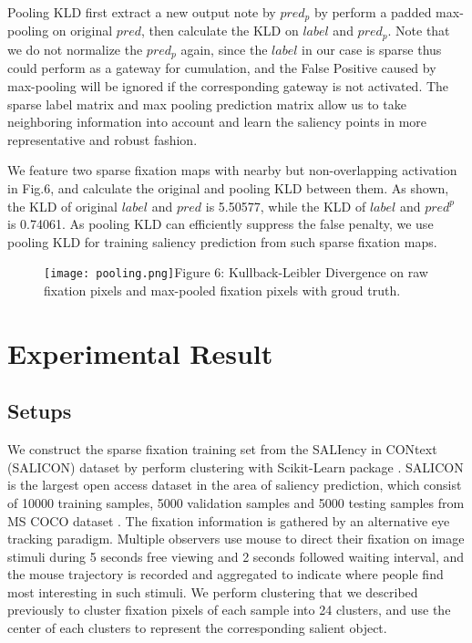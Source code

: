 \documentclass[letterpaper, 10 pt, conference]{ieeeconf}  %
\begin{document}
\par Pooling KLD first extract a new output note by $pred_{p}$ by perform a padded max-pooling on original $pred$, then calculate the KLD on $label$ and $pred_{p}$. Note that we do not normalize the $pred_{p}$ again, since the $label$ in our case is sparse thus could perform as a gateway for cumulation, and the False Positive caused by max-pooling will be ignored if the corresponding gateway is not activated. The sparse label matrix and max pooling prediction matrix allow us to take neighboring information into account and learn the saliency points in more representative and robust fashion.

\par We feature two sparse fixation maps with nearby but non-overlapping activation in Fig.6, and calculate the original and pooling KLD between them. As shown, the KLD of original $label$ and $pred$ is 5.50577, while the KLD of $label$ and $pred^{p}$ is 0.74061. As pooling KLD can efficiently suppress the false penalty, we use pooling KLD for training saliency prediction from such sparse fixation maps.

\begin{figure}
\centering
    \texttt{[image: pooling.png]}{Figure 6: Kullback-Leibler Divergence on raw fixation pixels and max-pooled fixation pixels with groud truth.\label{fig6}}
\end{figure}

\section{Experimental Result}

\subsection{Setups}

\par We construct the sparse fixation training set from the SALIency in CONtext (SALICON) dataset \cite{b19} by perform clustering with Scikit-Learn package \cite{b43}. SALICON is the largest open access dataset in the area of saliency prediction, which consist of 10000 training samples, 5000 validation samples and 5000 testing samples from MS COCO dataset \cite{b29}. The fixation information is gathered by an alternative eye tracking paradigm. Multiple observers use mouse to direct their fixation on image stimuli during 5 seconds free viewing and 2 seconds followed waiting interval, and the mouse trajectory is recorded and aggregated to indicate where people find most interesting in such stimuli. We perform clustering that we described previously to cluster fixation pixels of each sample into 24 clusters, and use the center of each clusters to represent the corresponding salient object.
\end{document}
